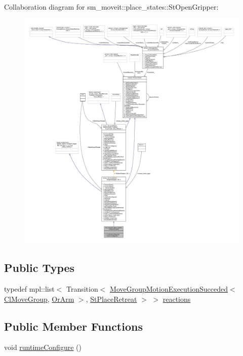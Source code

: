 Collaboration diagram for sm\+\_\+moveit\+:\+:place\+\_\+states\+:\+:St\+Open\+Gripper\+:
\nopagebreak
\begin{figure}[H]
\begin{center}
\leavevmode
\includegraphics[width=350pt]{structsm__moveit_1_1place__states_1_1StOpenGripper__coll__graph}
\end{center}
\end{figure}
\subsection*{Public Types}
\begin{DoxyCompactItemize}
\item 
typedef mpl\+::list$<$ Transition$<$ \hyperlink{structsm__moveit_1_1cl__movegroup_1_1MoveGroupMotionExecutionSucceded}{Move\+Group\+Motion\+Execution\+Succeded}$<$ \hyperlink{classsm__moveit_1_1cl__movegroup_1_1ClMoveGroup}{Cl\+Move\+Group}, \hyperlink{classsm__moveit_1_1OrArm}{Or\+Arm} $>$, \hyperlink{structsm__moveit_1_1place__states_1_1StPlaceRetreat}{St\+Place\+Retreat} $>$ $>$ \hyperlink{structsm__moveit_1_1place__states_1_1StOpenGripper_ad94ebdd7a2c49beba54325e2bd5c5ee5}{reactions}
\end{DoxyCompactItemize}
\subsection*{Public Member Functions}
\begin{DoxyCompactItemize}
\item 
void \hyperlink{structsm__moveit_1_1place__states_1_1StOpenGripper_a49b45992f2ff9a5f1435b14eab1f2621}{runtime\+Configure} ()
\end{DoxyCompactItemize}
